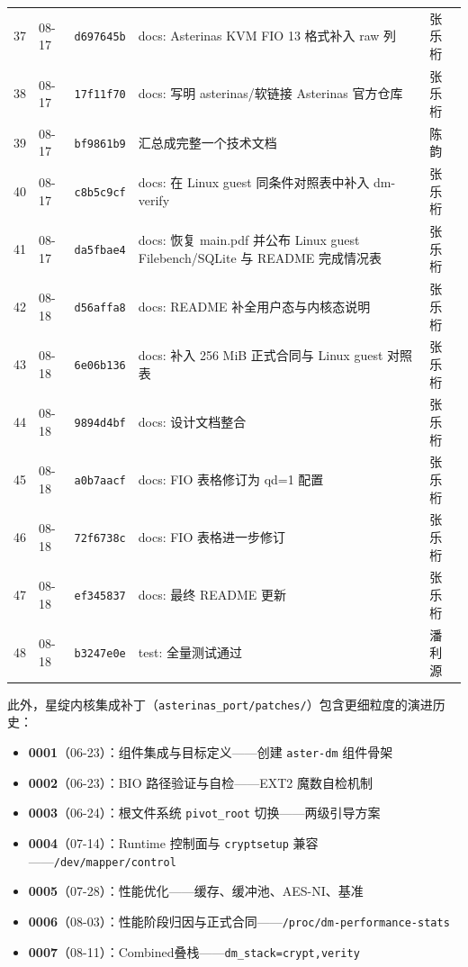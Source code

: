 \begin{table}[H]
\begin{tabular}{p{}p{}p{}p{}p{}}
        37 & 08-17 & \texttt{d697645b} & docs: Asterinas KVM FIO 13 格式补入 raw 列 & 张乐桁 \\
        38 & 08-17 & \texttt{17f11f70} & docs: 写明 asterinas/软链接 Asterinas 官方仓库 & 张乐桁 \\
        39 & 08-17 & \texttt{bf9861b9} & 汇总成完整一个技术文档 & 陈韵 \\
        40 & 08-17 & \texttt{c8b5c9cf} & docs: 在 Linux guest 同条件对照表中补入 dm-verify & 张乐桁 \\
        41 & 08-17 & \texttt{da5fbae4} & docs: 恢复 main.pdf 并公布 Linux guest Filebench/SQLite 与 README 完成情况表 & 张乐桁 \\
        42 & 08-18 & \texttt{d56affa8} & docs: README 补全用户态与内核态说明 & 张乐桁 \\
        43 & 08-18 & \texttt{6e06b136} & docs: 补入 256 MiB 正式合同与 Linux guest 对照表 & 张乐桁 \\
        44 & 08-18 & \texttt{9894d4bf} & docs: 设计文档整合 & 张乐桁 \\
        45 & 08-18 & \texttt{a0b7aacf} & docs: FIO 表格修订为 qd=1 配置 & 张乐桁 \\
        46 & 08-18 & \texttt{72f6738c} & docs: FIO 表格进一步修订 & 张乐桁 \\
        47 & 08-18 & \texttt{ef345837} & docs: 最终 README 更新 & 张乐桁 \\
        48 & 08-18 & \texttt{b3247e0e} & test: 全量测试通过 & 潘利源 \\
        \bottomrule
    \end{tabular}
\end{table}

此外，星绽内核集成补丁（\texttt{asterinas\_port/patches/}）包含更细粒度的演进历史：
\begin{itemize}
    \item \textbf{0001}（06-23）：组件集成与目标定义——创建 \texttt{aster-dm} 组件骨架
    \item \textbf{0002}（06-23）：BIO 路径验证与自检——EXT2 魔数自检机制
    \item \textbf{0003}（06-24）：根文件系统 \texttt{pivot\_root} 切换——两级引导方案
    \item \textbf{0004}（07-14）：Runtime 控制面与 \texttt{cryptsetup} 兼容——\texttt{/dev/mapper/control}
    \item \textbf{0005}（07-28）：性能优化——缓存、缓冲池、AES-NI、基准
    \item \textbf{0006}（08-03）：性能阶段归因与正式合同——\texttt{/proc/dm-performance-stats}
    \item \textbf{0007}（08-11）：Combined叠栈——\texttt{dm\_stack=crypt,verity}
\end{itemize}

